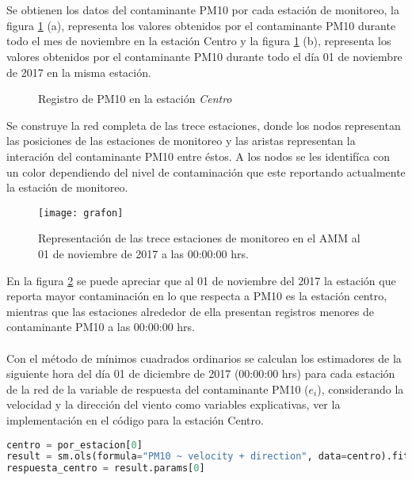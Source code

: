 \documentclass[a4paper, 11pt]{article}
\begin{document}
\section*{}

Se obtienen los datos del contaminante PM10 por cada estación de monitoreo, la figura \ref{figure2} (a), representa los valores obtenidos por el contaminante PM10 durante todo el mes de noviembre en la estación Centro y la figura \ref{figure2} (b), representa los valores obtenidos por el contaminante PM10 durante todo el día 01 de noviembre de 2017 en la misma estación.
\begin{figure}[H]
\centering
{}
\caption{Registro de PM10 en la estación \textit{Centro}}
\label{figure2}
\end{figure}

Se construye la red completa de las trece estaciones, donde los nodos representan las posiciones de las estaciones de monitoreo y las aristas representan la interación del contaminante PM10 entre éstos. A los nodos se les identifíca con un color dependiendo del nivel de contaminación que este reportando actualmente la estación de monitoreo.
\begin{figure}[H]
\centering
\texttt{[image: grafon]}
\caption{Representación de las trece estaciones de monitoreo en el AMM al 01 de noviembre de 2017 a las 00:00:00 hrs. }
\label{figure3}
\end{figure}

En la figura \ref{figure3} se puede apreciar que al 01 de noviembre del 2017 la estación que reporta mayor contaminación en lo que respecta a PM10 es la estación centro, mientras que las estaciones alrededor de ella presentan registros menores de contaminante PM10 a las 00:00:00 hrs.
\\ \\
Con el método de mínimos cuadrados ordinarios se calculan los estimadores de la siguiente hora del día 01 de diciembre de 2017 (00:00:00 hrs)  para cada estación de la red de la variable de respuesta del contaminante PM10 ($e_{i}$), considerando la velocidad y la dirección del viento como variables explicativas, ver la implementación en el código para la estación Centro. 

\begin{lstlisting}[language=Python]
centro = por_estacion[0]
result = sm.ols(formula="PM10 ~ velocity + direction", data=centro).fit()
respuesta_centro = result.params[0]
\end{lstlisting}
\end{document}
